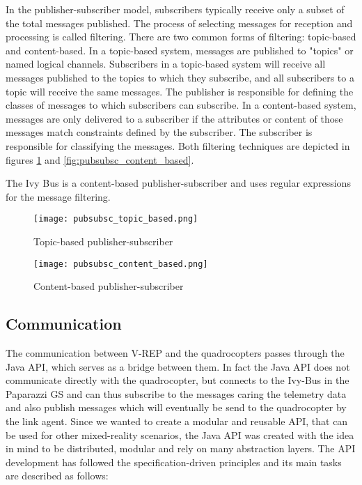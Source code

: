 In the publisher-subscriber model, subscribers typically receive only a subset of the total messages published. The process of selecting messages for reception and processing is called filtering. There are two common forms of filtering: topic-based and content-based.
In a topic-based system, messages are published to "topics" or named logical channels. Subscribers in a topic-based system will receive all messages published to the topics to which they subscribe, and all subscribers to a topic will receive the same messages. The publisher is responsible for defining the classes of messages to which subscribers can subscribe.
In a content-based system, messages are only delivered to a subscriber if the attributes or content of those messages match constraints defined by the subscriber. The subscriber is responsible for classifying the messages. Both filtering techniques are depicted in figures \ref{fig:pubsubsc_topic_based} and \ref{fig:pubsubsc_content_based}.

The Ivy Bus is a content-based publisher-subscriber and uses regular expressions for the message filtering.

\begin{figure}[!tbp]
  \centering
  \begin{minipage}[b]{0.4\textwidth}
    \texttt{[image: pubsubsc\_topic\_based.png]}
    \caption{Topic-based publisher-subscriber \label{fig:pubsubsc_content_based}}
  \end{minipage}
  \hfill
  \begin{minipage}[b]{0.4\textwidth}
    \texttt{[image: pubsubsc\_content\_based.png]}
    \caption{Content-based publisher-subscriber \label{fig:pubsubsc_topic_based}}
  \end{minipage}
\end{figure}

\subsection{Communication}

The communication between V-REP and the quadrocopters passes through the Java API, which serves as a bridge between them. In fact the Java API does not communicate directly with the quadrocopter, but connects to the Ivy-Bus in the Paparazzi GS and can thus subscribe to the messages caring the telemetry data and also publish messages which will eventually be send to the quadrocopter by the link agent.
Since we wanted to create a modular and reusable API, that can be used for other mixed-reality scenarios, the Java API was created with the idea in mind to be distributed, modular and rely on many abstraction layers. The API development has followed the specification-driven principles and its main tasks are described as follows:

